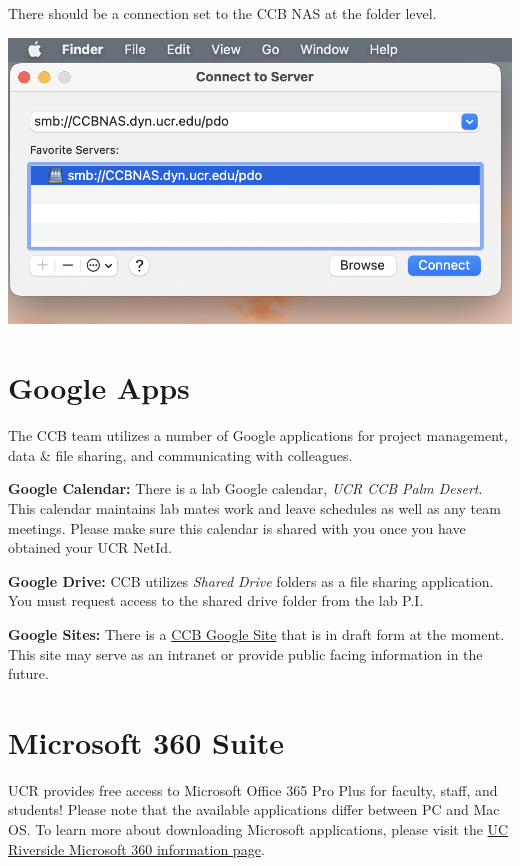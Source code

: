 \documentclass[
]{book}
\begin{document}
There should be a connection set to the CCB NAS at the folder level.

\begin{flushleft}\includegraphics{images/nas_mac} \end{flushleft}

\hypertarget{google-apps}{%
\section{Google Apps}\label{google-apps}}

The CCB team utilizes a number of Google applications for project management, data \& file sharing, and communicating with colleagues.

\textbf{Google Calendar:} There is a lab Google calendar, \emph{UCR CCB Palm Desert}. This calendar maintains lab mates work and leave schedules as well as any team meetings. Please make sure this calendar is shared with you once you have obtained your UCR NetId.

\textbf{Google Drive:} CCB utilizes \emph{Shared Drive} folders as a file sharing application. You must request access to the shared drive folder from the lab P.I.

\textbf{Google Sites:} There is a \href{https://sites.google.com/ucr.edu/ccbucr/home}{CCB Google Site} that is in draft form at the moment. This site may serve as an intranet or provide public facing information in the future.

\hypertarget{microsoft-360-suite}{%
\section{Microsoft 360 Suite}\label{microsoft-360-suite}}

UCR provides free access to Microsoft Office 365 Pro Plus for faculty, staff, and students! Please note that the available applications differ between PC and Mac OS. To learn more about downloading Microsoft applications, please visit the
\href{https://ucrsupport.service-now.com/ucr_portal/?id=kb_article\&sys_id=0868da980f602f0086b7c7dce1050ee0}{UC Riverside Microsoft 360 information page}.
\end{document}
